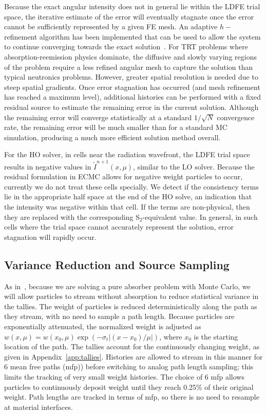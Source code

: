 Because the exact angular intensity does not in general lie within the LDFE trial space, the
iterative estimate of the error will eventually stagnate once the error cannot be sufficiently
represented by a given FE mesh.  An adaptive $h-$refinement algorithm has been
implemented that can be used to allow the system to continue converging towards the
exact solution~\cite{jake,ans_2014}. For TRT problems where absorption-reemission physics dominate, the diffusive and slowly varying
regions of the problem require a less refined angular mesh to capture the solution than typical neutronics
problems.  However, greater spatial resolution is needed due to steep spatial
gradients.   
Once error stagnation has occurred (and mesh refinement has reached a maximum level),
additional histories can be performed with a
fixed residual source to estimate the remaining error in the current solution.  Although the remaining error will
converge statistically at a standard $1/\sqrt{N}$ convergence rate, the remaining
error will be much smaller than for a standard MC simulation, producing a much more
efficient solution method overall.

For the HO solver, in cells near the radiation wavefront, the LDFE trial space results in
negative values in $\tilde{I}^{n+1}(x,\mu)$, similar to the LO solver.  Because the residual formulation in ECMC allows for negative weight
particles to occur, currently we do not treat these cells specially.  We detect if
the consistency terms lie in the appropriate half space at the end of the HO solve,
an indication that the intensity was negative within that cell.  If the terms are non-physical, then
they are replaced with the corresponding S$_2$-equivalent value. In general,
in such cells where the trial space cannot accurately represent the solution, error stagnation will
rapidly occur. 

\subsection{Variance Reduction and Source Sampling}


As in~\cite{park}, because we are solving a pure absorber problem with Monte Carlo, we will allow
particles to stream without absorption to reduce statistical 
variance in the tallies.  The weight of particles is reduced deterministically along
the path as they stream, with no need to sample a path length.  Because particles are exponentially attenuated, the normalized weight is
adjusted as $w(x,\mu) = w(x_0,\mu)\exp(-\sigma_t|(x-x_0)/\mu|)$, where $x_0$ is the starting location of the path.  The tallies account
for the continuously changing weight, as given in Appendix~\ref{app:tallies}. Histories are allowed to stream in this manner for 6 mean free paths (mfp))
before switching to analog path length sampling; this limits the tracking of very small weight histories. The choice of 6 mfp allows particles to 
continuously deposit weight until they reach 0.25\% of their original weight.  Path lengths are tracked in terms of mfp, so there is no need to resample at material
interfaces.

